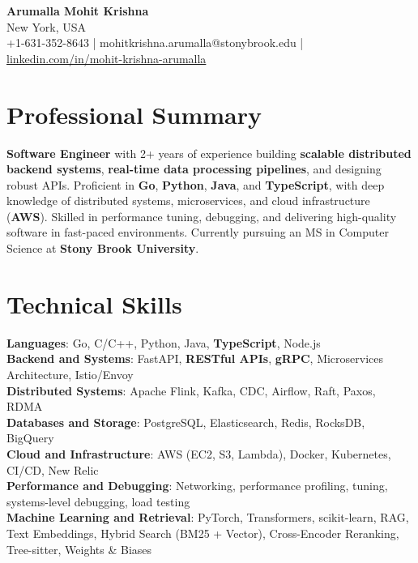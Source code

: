 \documentclass[letterpaper,11pt]{article}
\begin{document}
\begin{center}
  {\Large \textbf{Arumalla Mohit Krishna}} \\
  New York, USA \\
  +1-631-352-8643 \enspace | \enspace mohitkrishna.arumalla@stonybrook.edu \enspace | \enspace \href{https://www.linkedin.com/in/mohit-krishna-arumalla}{linkedin.com/in/mohit-krishna-arumalla}
\end{center}

\section{Professional Summary}
  \begin{itemize}[leftmargin=0.15in, label={}]
    \small{\item{
     \textbf{Software Engineer} with 2+ years of experience building \textbf{scalable distributed backend systems}, \textbf{real-time data processing pipelines}, and designing robust APIs. Proficient in \textbf{Go}, \textbf{Python}, \textbf{Java}, and \textbf{TypeScript}, with deep knowledge of distributed systems, microservices, and cloud infrastructure (\textbf{AWS}). Skilled in performance tuning, debugging, and delivering high-quality software in fast-paced environments. Currently pursuing an MS in Computer Science at \textbf{Stony Brook University}.
    }}
  \end{itemize}
\vspace{-16pt}

\section{Technical Skills}
 \begin{itemize}[leftmargin=0.15in, label={}]
    \small{\item{
     \textbf{Languages}: Go, C/C++, Python, Java, \textbf{TypeScript}, Node.js \\
     \textbf{Backend and Systems}: FastAPI, \textbf{RESTful APIs}, \textbf{gRPC}, Microservices Architecture, Istio/Envoy \\
     \textbf{Distributed Systems}: Apache Flink, Kafka, CDC, Airflow, Raft, Paxos, RDMA \\
     \textbf{Databases and Storage}: PostgreSQL, Elasticsearch, Redis, RocksDB, BigQuery \\
     \textbf{Cloud and Infrastructure}: AWS (EC2, S3, Lambda), Docker, Kubernetes, CI/CD, New Relic \\
     \textbf{Performance and Debugging}: Networking, performance profiling, tuning, systems-level debugging, load testing \\
     \textbf{Machine Learning and Retrieval}: PyTorch, Transformers, scikit-learn, RAG, Text Embeddings, Hybrid Search (BM25 + Vector), Cross-Encoder Reranking, Tree-sitter, Weights \& Biases
    }}
 \end{itemize}
\vspace{-16pt}
\end{document}
